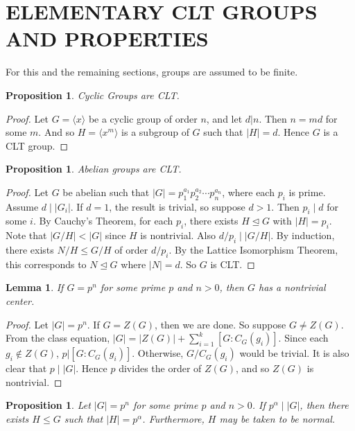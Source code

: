 \documentclass[12pt]{report}
\theoremstyle{newthm}
\newtheorem{Proposition}[lem]{Proposition}
\newtheorem{Lemma}[lem]{Lemma}
\newtheorem{prop}[lem]{Proposition}
\begin{document}
\newpage
\section{ELEMENTARY CLT GROUPS AND PROPERTIES}
 
For this and the remaining sections, groups are assumed to be finite.
 
\begin{prop}\label{Cyclic CLT} Cyclic Groups are CLT.
\end{prop}

\begin{proof}
Let $G=\langle x \rangle$ be a cyclic group of order $n$, and let $d|n$. Then $n=md$ for some $m$. And so $H = \langle x^m\rangle$ is a subgroup of $G$ such that $|H|=d$. Hence $G$ is a CLT group. 
\end{proof}


\begin{prop}\label{Abelian CLT} Abelian groups are CLT.
\end{prop}

\begin{proof}
Let $G$ be abelian such that $|G|=p_1^{a_1}p_2^{a_2}\dotsi p_n^{a_n}$, where each $p_i$ is prime. Assume $d \mid |G_i|$. If  $d=1$, the result is trivial, so suppose $d>1$. Then $p_i\mid d$ for some $i$. By Cauchy's Theorem, for each $p_i$, there exists $H\trianglelefteq G$ with $|H|=p_i$. Note that $|G/H|<|G|$ since $H$ is nontrivial. Also ${d}/{p_i}\mid|G/H|$. By induction, there exists $N/H\leq G/H$ of order $d/p_i$. By the Lattice Isomorphism Theorem, this corresponds to $N\trianglelefteq G$ where $|N|=d.$ So $G$ is CLT.
\end{proof}

\begin{Lemma}\label{nontriv center} If $G=p^n$ for some prime $p$ and $n>0$, then $G$ has a nontrivial center.
\end{Lemma}

\begin{proof}
Let $|G|=p^n$. If $G=Z(G)$, then we are done. So suppose $G\neq Z(G)$. From the class equation, $|G|= |Z(G)|+\sum_{i=1}^k[G:C_G(g_i)]$. Since each $g_i\not\in Z(G)$, $p|[G:C_G(g_i)]$. Otherwise, $G/{C_G(g_i)}$ would be trivial. It is also clear that $p\mid|G|$. Hence $p$ divides the order of $Z(G)$, and so $Z(G)$ is nontrivial. 
\end{proof}

\begin{Proposition}\label{p group lem} Let $|G|=p^n$ for some prime $p$ and $n>0$. If $p^\alpha\mid |G|$, then there exists $H\leq G$ such that $|H|=p^\alpha$. Furthermore, $H$ may be taken to be normal.
\end{Proposition}
\end{document}
